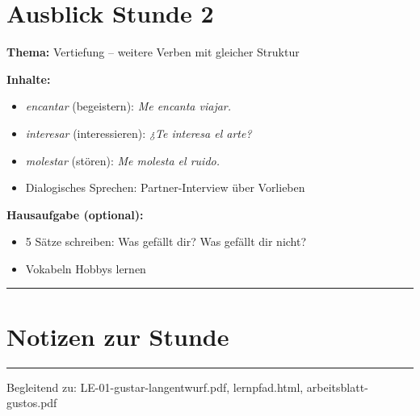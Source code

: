 \documentclass[10pt, a4paper]{article}
\newcommand{\es}[1]{\textcolor{spanisch}{\textit{#1}}}
\begin{document}
\section{Ausblick Stunde 2}

\textbf{Thema:} Vertiefung -- weitere Verben mit gleicher Struktur

\textbf{Inhalte:}
\begin{itemize}[nosep, leftmargin=1.5em]
    \item \es{encantar} (begeistern): \es{Me encanta viajar.}
    \item \es{interesar} (interessieren): \es{¿Te interesa el arte?}
    \item \es{molestar} (stören): \es{Me molesta el ruido.}
    \item Dialogisches Sprechen: Partner-Interview über Vorlieben
\end{itemize}

\textbf{Hausaufgabe (optional):}
\begin{itemize}[nosep, leftmargin=1.5em]
    \item 5 Sätze schreiben: Was gefällt dir? Was gefällt dir nicht?
    \item Vokabeln Hobbys lernen
\end{itemize}

\vspace{8pt}
\hrule
\vspace{6pt}

\section*{Notizen zur Stunde}

\vspace{4cm}

\hrule

\vfill

{\small\color{grau}
Begleitend zu: LE-01-gustar-langentwurf.pdf, lernpfad.html, arbeitsblatt-gustos.pdf
}
\end{document}
